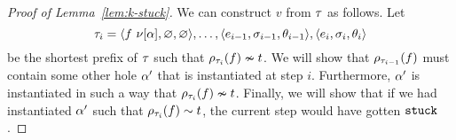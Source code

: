 \begin{proof}[Proof of Lemma~\ref{lem:k-stuck}]
  We can construct $v$ from $\tau$ as follows.
  Let
  $$
  \tau_i = \langle f\ \nu[\alpha], \varnothing, \varnothing \rangle,
             \ldots,
             \langle e_{i-1}, \sigma_{i-1}, \theta_{i-1} \rangle,
             \langle e_{i}, \sigma_{i}, \theta_{i} \rangle
  $$
  be the shortest prefix of $\tau$ such that
  $\rho_{\tau_i}(f) \nsim t$.
  We will show that $\rho_{\tau_{i-1}}(f)$ %
  must contain some other hole $\alpha'$ that is
  instantiated at step $i$.
  Furthermore, $\alpha'$ is instantiated in such a way that
  $\rho_{\tau_i}(f) \nsim t$.
  Finally, we will show that if we had instantiated $\alpha'$ such that
  $\rho_{\tau_i}(f) \sim t$,
  the current step would have gotten $\mathtt{stuck}$.


\end{proof}
